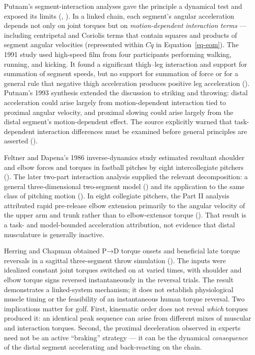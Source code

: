 \documentclass[
  letterpaper,
]{report}
\begin{document}
Putnam's segment-interaction analyses gave the principle a dynamical
test and exposed its limits (,
). In a linked chain, each segment's
angular acceleration depends not only on joint torques but on
\emph{motion-dependent interaction terms} --- including centripetal and
Coriolis terms that contain squares and products of segment angular
velocities (represented within \(C\dot q\) in Equation~\ref{eq-eom}).
The 1991 study used high-speed film from four participants performing
walking, running, and kicking. It found a significant thigh--leg
interaction and support for summation of segment speeds, but no support
for summation of force or for a general rule that negative thigh
acceleration produces positive leg acceleration
(). Putnam's 1993 synthesis
extended the discussion to striking and throwing: distal acceleration
could arise largely from motion-dependent interaction tied to proximal
angular velocity, and proximal slowing could arise largely from the
distal segment's motion-dependent effect. The source explicitly warned
that task-dependent interaction differences must be examined before
general principles are asserted ().

Feltner and Dapena's 1986 inverse-dynamics study estimated resultant
shoulder and elbow forces and torques in fastball pitches by eight
intercollegiate pitchers (). The later two-part interaction analysis supplied the relevant
decomposition: a general three-dimensional two-segment model
() and its
application to the same class of pitching motion
(). In eight collegiate
pitchers, the Part II analysis attributed rapid pre-release elbow
extension primarily to the angular velocity of the upper arm and trunk
rather than to elbow-extensor torque
(). That result is a task- and
model-bounded acceleration attribution, not evidence that distal
musculature is generally inactive.

Herring and Chapman obtained P→D torque onsets and beneficial late
torque reversals in a sagittal three-segment throw simulation
(). The inputs were
idealized constant joint torques switched on at varied times, with
shoulder and elbow torque signs reversed instantaneously in the reversal
trials. The result demonstrates a linked-system mechanism; it does not
establish physiological muscle timing or the feasibility of an
instantaneous human torque reversal. Two implications matter for golf.
First, kinematic order does not reveal \emph{which} torques produced it:
an identical peak sequence can arise from different mixes of muscular
and interaction torques. Second, the proximal deceleration observed in
experts need not be an active ``braking'' strategy --- it can be the
dynamical \emph{consequence} of the distal segment accelerating and
back-reacting on the chain.
\end{document}
